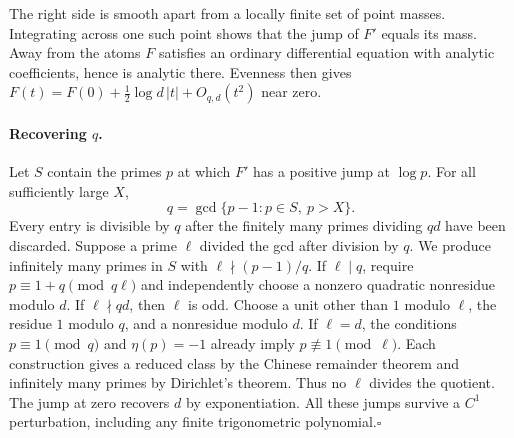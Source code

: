 The right side is smooth apart from a locally finite set of point masses.
Integrating across one such point shows that the jump of $F'$ equals its mass.
Away from the atoms $F$ satisfies an ordinary differential equation with
analytic coefficients, hence is analytic there. Evenness then gives
$F(t)=F(0)+\tfrac12\log d\,|t|+O_{q,d}(t^2)$ near zero.

\paragraph{Recovering $q$.}
Let $S$ contain the primes $p$ at which $F'$ has a positive jump at $\log p$.
For all sufficiently large $X$,
\[
 q=\gcd\{p-1:p\in S,\ p>X\}.
\]
Every entry is divisible by $q$ after the finitely many primes dividing $qd$
have been discarded. Suppose a prime $\ell$ divided the gcd after division by
$q$. We produce infinitely many primes in $S$ with $\ell\nmid(p-1)/q$.
If $\ell\mid q$, require $p\equiv1+q\pmod{q\ell}$ and independently choose a
nonzero quadratic nonresidue modulo $d$. If $\ell\nmid qd$, then $\ell$ is odd.
Choose a unit other than $1$ modulo $\ell$, the residue $1$ modulo $q$, and a
nonresidue modulo $d$. If $\ell=d$, the conditions $p\equiv1\pmod q$ and
$\eta(p)=-1$ already imply $p\not\equiv1\pmod\ell$. Each construction gives
a reduced class by the Chinese remainder theorem and infinitely many primes
by Dirichlet's theorem. Thus no $\ell$ divides the quotient. The jump at zero
recovers $d$ by exponentiation. All these jumps survive a $C^1$ perturbation,
including any finite trigonometric polynomial.\hfill$\square$

